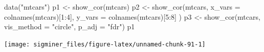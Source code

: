 \documentclass[
  12pt,
  a4paper,
  twoside]{book}
\newenvironment{Shaded}{\begin{snugshade}}{\end{snugshade}}
\newcommand{\AttributeTok}[1]{\textcolor[rgb]{0.77,0.63,0.00}{#1}}
\newcommand{\DecValTok}[1]{\textcolor[rgb]{0.00,0.00,0.81}{#1}}
\newcommand{\FunctionTok}[1]{\textcolor[rgb]{0.00,0.00,0.00}{#1}}
\newcommand{\NormalTok}[1]{#1}
\newcommand{\OtherTok}[1]{\textcolor[rgb]{0.56,0.35,0.01}{#1}}
\newcommand{\SpecialCharTok}[1]{\textcolor[rgb]{0.00,0.00,0.00}{#1}}
\newcommand{\StringTok}[1]{\textcolor[rgb]{0.31,0.60,0.02}{#1}}
\begin{document}
\begin{Shaded}
\begin{Highlighting}[]
\FunctionTok{data}\NormalTok{(}\StringTok{"mtcars"}\NormalTok{)}
\NormalTok{p1 }\OtherTok{\textless{}{-}} \FunctionTok{show\_cor}\NormalTok{(mtcars)}
\NormalTok{p2 }\OtherTok{\textless{}{-}} \FunctionTok{show\_cor}\NormalTok{(mtcars,}
  \AttributeTok{x\_vars =} \FunctionTok{colnames}\NormalTok{(mtcars)[}\DecValTok{1}\SpecialCharTok{:}\DecValTok{4}\NormalTok{],}
  \AttributeTok{y\_vars =} \FunctionTok{colnames}\NormalTok{(mtcars)[}\DecValTok{5}\SpecialCharTok{:}\DecValTok{8}\NormalTok{]}
\NormalTok{)}
\NormalTok{p3 }\OtherTok{\textless{}{-}} \FunctionTok{show\_cor}\NormalTok{(mtcars, }\AttributeTok{vis\_method =} \StringTok{"circle"}\NormalTok{, }\AttributeTok{p\_adj =} \StringTok{"fdr"}\NormalTok{)}
\NormalTok{p1}
\end{Highlighting}
\end{Shaded}

\texttt{[image: sigminer\_files/figure-latex/unnamed-chunk-91-1]}
\end{document}

